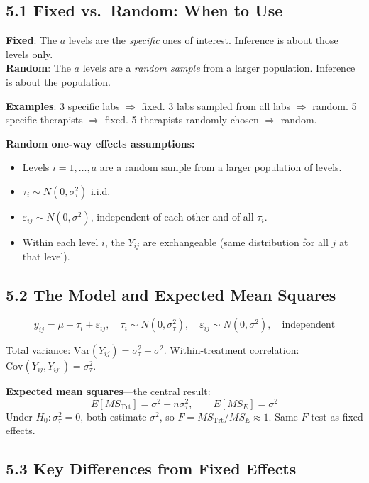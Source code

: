 \documentclass[9pt,letterpaper]{article}
\begin{document}
\subsection{5.1 Fixed vs.\ Random: When to Use}

\begin{keybox}
\textbf{Fixed}: The $a$ levels are the \emph{specific} ones of interest. Inference is about those levels only.\\
\textbf{Random}: The $a$ levels are a \emph{random sample} from a larger population. Inference is about the population.
\end{keybox}

\textbf{Examples}: 3 specific labs $\Rightarrow$ fixed. 3 labs sampled from all labs $\Rightarrow$ random. 5 specific therapists $\Rightarrow$ fixed. 5 therapists randomly chosen $\Rightarrow$ random.

\textbf{Random one-way effects assumptions:}
\begin{itemize}
  \item Levels $i=1,\ldots,a$ are a random sample from a larger population of levels.
  \item $\tau_i\sim N(0,\sigma_\tau^2)$ i.i.d.
  \item $\varepsilon_{ij}\sim N(0,\sigma^2)$, independent of each other and of all $\tau_i$.
  \item Within each level $i$, the $Y_{ij}$ are exchangeable (same distribution for all $j$ at that level).
\end{itemize}

\subsection{5.2 The Model and Expected Mean Squares}
\[
y_{ij} = \mu + \tau_i + \varepsilon_{ij}, \quad \tau_i \sim N(0, \sigma_\tau^2), \quad \varepsilon_{ij} \sim N(0, \sigma^2), \quad \text{independent}
\]

Total variance: $\text{Var}(Y_{ij}) = \sigma_\tau^2 + \sigma^2$. Within-treatment correlation: $\text{Cov}(Y_{ij}, Y_{ij'}) = \sigma_\tau^2$.

\textbf{Expected mean squares}---the central result:
\[
E[MS_{\text{Trt}}] = \sigma^2 + n\sigma_\tau^2, \qquad E[MS_E] = \sigma^2
\]
Under $H_0: \sigma_\tau^2 = 0$, both estimate $\sigma^2$, so $F = MS_{\text{Trt}}/MS_E \approx 1$. Same $F$-test as fixed effects.

\subsection{5.3 Key Differences from Fixed Effects}
\end{document}
